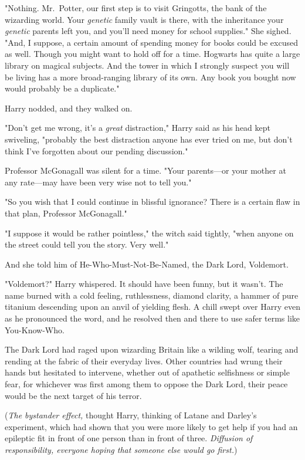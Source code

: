 "Nothing. Mr.~Potter, our first step is to visit Gringotts, the bank of the
wizarding world. Your \emph{genetic} family vault is there, with the
inheritance your \emph{genetic} parents left you, and you'll need money for
school supplies." She sighed. "And, I suppose, a certain amount of spending
money for books could be excused as well. Though you might want to hold off for
a time. Hogwarts has quite a large library on magical subjects. And the tower
in which I strongly suspect you will be living has a more broad-ranging
library of its own. Any book you bought now would probably be a duplicate."

Harry nodded, and they walked on.

"Don't get me wrong, it's a \emph{great} distraction," Harry said as his head
kept swiveling, "probably the best distraction anyone has ever tried on me,
but don't think I've forgotten about our pending discussion."

Professor McGonagall was silent for a time.
"Your parents—or your mother at any rate—may
have been very wise not to tell you."

"So you wish that I could continue in blissful ignorance? There is a certain
flaw in that plan, Professor McGonagall."

"I suppose it would be rather pointless," the witch said tightly, "when anyone
on the street could tell you the story. Very well."

And she told him of He-Who-Must-Not-Be-Named, the Dark Lord, Voldemort.

"Voldemort?" Harry whispered. It should have been funny, but it wasn't. The
name burned with a cold feeling, ruthlessness, diamond clarity, a hammer of
pure titanium descending upon an anvil of yielding flesh. A chill swept over
Harry even as he pronounced the word, and he resolved then and there to use
safer terms like You-Know-Who.

The Dark Lord had raged upon wizarding Britain like a wilding wolf, tearing and
rending at the fabric of their everyday lives. Other countries had wrung their
hands but hesitated to intervene, whether out of apathetic selfishness or
simple fear, for whichever was first among them to oppose the Dark Lord, their
peace would be the next target of his terror.

(\emph{The bystander effect,} thought Harry, thinking of Latane and Darley's
experiment, which had shown that you were more likely to get help if you had an
epileptic fit in front of one person than in front of three. \emph{Diffusion of
responsibility, everyone hoping that someone else would go first.})

